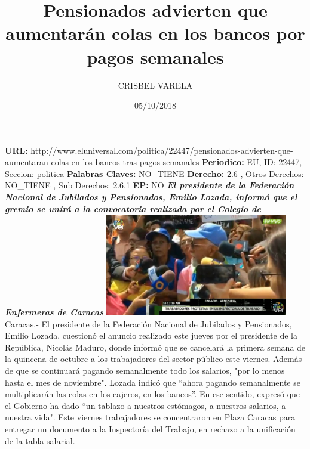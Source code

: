 \documentclass{article}%
\title{\textbf{Pensionados advierten que aumentarán colas en los bancos por pagos semanales}}%
\author{CRISBEL VARELA}%
\date{05/10/2018}%
\begin{document}
%
\normalsize%
\maketitle%
\textbf{URL: }%
http://www.eluniversal.com/politica/22447/pensionados{-}advierten{-}que{-}aumentaran{-}colas{-}en{-}los{-}bancos{-}tras{-}pagos{-}semanales\newline%
%
\textbf{Periodico: }%
EU, %
ID: %
22447, %
Seccion: %
politica\newline%
%
\textbf{Palabras Claves: }%
NO\_TIENE\newline%
%
\textbf{Derecho: }%
2.6%
, Otros Derechos: %
NO\_TIENE%
, Sub Derechos: %
2.6.1%
\newline%
%
\textbf{EP: }%
NO\newline%
\newline%
%
\textbf{\textit{El presidente de la Federación Nacional de Jubilados y Pensionados,  Emilio Lozada, informó que el gremio se unirá a la convocatoria realizada por el Colegio de Enfermeras de Caracas}}%
\newline%
\newline%
%
\includegraphics[width=300px]{201.jpg}%
\newline%
%
Caracas.{-} El presidente de la Federación Nacional de Jubilados y Pensionados, Emilio Lozada, cuestionó el anuncio realizado este jueves por el presidente de la República, Nicolás Maduro, donde informó que se cancelará la primera semana de la quincena de octubre a los trabajadores del sector público este viernes. Además de que se continuará pagando semanalmente todo los salarios, "por lo menos hasta el mes de noviembre".%
\newline%
%
Lozada indicó que “ahora pagando semanalmente se multiplicarán las colas en los cajeros, en los bancos”.%
\newline%
%
En ese sentido, expresó que el Gobierno ha dado “un tablazo a nuestros estómagos, a nuestros salarios, a nuestra vida".%
\newline%
%
Este viernes trabajadores se concentraron en Plaza Caracas para entregar un documento a la Inspectoría del Trabajo, en rechazo a la unificación de la tabla salarial.%
\end{document}
